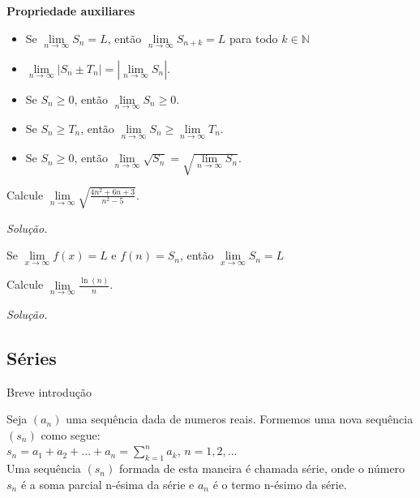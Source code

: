 \newpage
\textbf{Propriedade auxiliares}
\begin{itemize}
	\item Se  $\lim\limits_{n\longrightarrow \infty} S_{n}=L$, então $\lim\limits_{n\longrightarrow \infty} S_{n+k}=L$ para todo $k\in \mathbb{N} $
	\item $\lim\limits_{n\longrightarrow \infty} \left|  S_{n}\pm T_{n}\right|  =\left| \lim\limits_{n\longrightarrow \infty}  S_{n}\right| $.
	\item Se $S_{n}\geq 0$, então $\lim\limits_{n\longrightarrow \infty} S_{n} \geq 0$.
	\item Se $S_{n}\geq T_{n}$, então $\lim\limits_{n\longrightarrow \infty} S_{n} \geq \lim\limits_{n\longrightarrow \infty}T_{n}$.
	\item Se $S_{n}\geq 0$, então $\lim\limits_{n\longrightarrow \infty} \sqrt{S_{n}} =\sqrt{\lim\limits_{n\longrightarrow \infty} S_{n} }$.
\end{itemize}
\begin{ex}
	Calcule $\lim\limits_{n\longrightarrow \infty}\sqrt{\frac{4n^{2}+6n+3}{n^{2}-5}} $.
\end{ex}
\textit{Solução.}
\vspace*{5cm}
\begin{teo} 
	Se $\lim\limits_{x\longrightarrow \infty} f(x)=L$ e $f(n)=S_{n}$, então $\lim\limits_{x\longrightarrow \infty} S_{n}=L$
\end{teo}
\begin{ex}
	Calcule $\lim\limits_{n\longrightarrow \infty}\frac{\ln (n)}{n} $.
\end{ex}
\textit{Solução.}
\vspace*{5cm}
\begin{center}
\section{Séries}
\end{center}
Breve introdução
\vspace*{5cm}
\begin{df}
	Seja $\left( a_{n}\right) $ uma sequência dada de numeros reais. Formemos uma nova sequência $\left( s_{n}\right) $ como segue:\\
	$s_{n}=a_{1}+a_{2}+...+a_{n}=\sum_{k=1}^{n} a_{k}$, $n=1,2,...$\\
	Uma sequência $\left( s_{n}\right)$ formada de esta maneira é chamada série, onde o número $s_{n}$ é a soma parcial n-ésima da série e $a_{n}$ é o termo n-ésimo da série.
\end{df}
